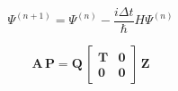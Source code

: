 \documentclass{article}
\begin{document}
\[ \Psi^{(n+1)} = \Psi^{(n)} - \frac{i\Delta t}{\hbar}H\Psi^{(n)} \]
\pagebreak

\[ \mathbf{A} \, \mathbf{P} = \mathbf{Q} \, \begin{bmatrix} \mathbf{T} & \mathbf{0} \\ \mathbf{0} & \mathbf{0} \end{bmatrix} \, \mathbf{Z} \]
\pagebreak
\end{document}

